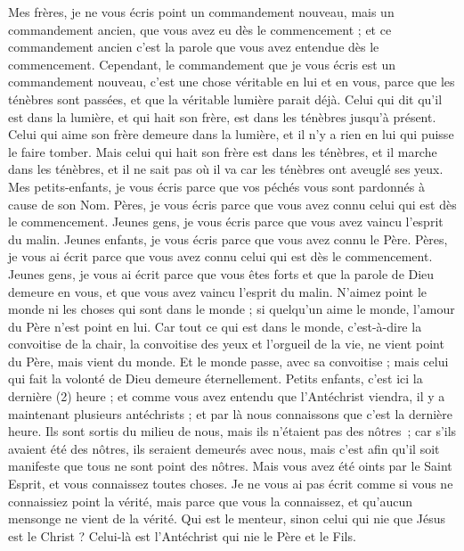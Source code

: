 \begin{multicols}{2}
Mes frères, je ne vous écris point un commandement nouveau, mais un commandement ancien, que vous avez eu dès le commencement ; et ce commandement ancien c'est la parole que vous avez entendue dès le commencement.
Cependant, le commandement que je vous écris est un commandement nouveau, c’est une chose véritable en lui et en vous, parce que les ténèbres sont passées, et que la véritable lumière parait déjà.
Celui qui dit qu'il est dans la lumière, et qui hait son frère, est dans les ténèbres jusqu'à présent.
Celui qui aime son frère demeure dans la lumière, et il n'y a rien en lui qui puisse le faire tomber.
Mais celui qui hait son frère est dans les ténèbres, et il marche dans les ténèbres, et il ne sait pas où il va car les ténèbres ont aveuglé ses yeux.
Mes petits-enfants, je vous écris parce que vos péchés vous sont pardonnés à cause de son Nom.
Pères, je vous écris parce que vous avez connu celui qui est dès le commencement. Jeunes gens, je vous écris parce que vous avez vaincu l’esprit du malin.
Jeunes enfants, je vous écris parce que vous avez connu le Père. Pères, je vous ai écrit parce que vous avez connu celui qui est dès le commencement. Jeunes gens, je vous ai écrit parce que vous êtes forts et que la parole de Dieu demeure en vous, et que vous avez vaincu l’esprit du malin.
N'aimez point le monde ni les choses qui sont dans le monde ; si quelqu'un aime le monde, l'amour du Père n'est point en lui.
Car tout ce qui est dans le monde, c'est-à-dire la convoitise de la chair, la convoitise des yeux et l'orgueil de la vie, ne vient point du Père, mais vient du monde.
Et le monde passe, avec sa convoitise ; mais celui qui fait la volonté de Dieu demeure éternellement.
Petits enfants, c'est ici la dernière (2) heure ; et comme vous avez entendu que l'Antéchrist viendra, il y a maintenant plusieurs antéchrists ; et par là nous connaissons que c'est la dernière heure.
Ils sont sortis du milieu de nous, mais ils n'étaient pas des nôtres ; car s'ils avaient été des nôtres, ils seraient demeurés avec nous, mais c'est afin qu'il soit manifeste que tous ne sont point des nôtres.
Mais vous avez été oints par le Saint Esprit, et vous connaissez toutes choses.
Je ne vous ai pas écrit comme si vous ne connaissiez point la vérité, mais parce que vous la connaissez, et qu'aucun mensonge ne vient de la vérité.
Qui est le menteur, sinon celui qui nie que Jésus est le Christ ? Celui-là est l'Antéchrist qui nie le Père et le Fils.

\end{multicols}
